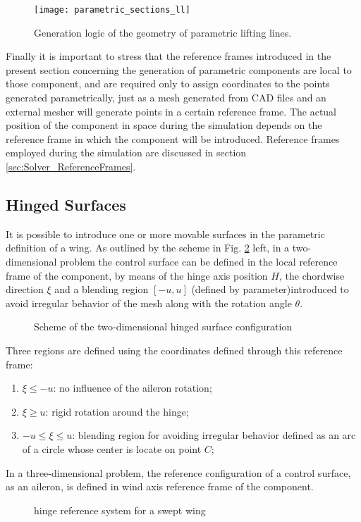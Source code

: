 \begin{figure}[h]
\centering
\texttt{[image: parametric\_sections\_ll]}
\caption{Generation logic of the geometry of parametric lifting lines.}
\label{fig:parametric_sections_ll}
\end{figure}

Finally it is important to stress that the reference frames introduced in the present section 
concerning the generation of parametric components are local to those component, and are required 
only to assign coordinates to the points generated parametrically, just as a mesh generated from 
CAD files and an external mesher will generate points in a certain reference frame. 
The actual position of the component in space during the simulation depends on the reference 
frame in which the component will be introduced. Reference frames employed during the simulation 
are discussed in section \ref{sec:Solver_ReferenceFrames}.

\subsection{Hinged Surfaces}
\label{sec:Hinge_surfaces}
It is possible to introduce one or more movable surfaces in the parametric definition of a wing.
As outlined by the scheme in Fig. \ref{fig:hinge} left, in a two-dimensional problem the control 
surface can be defined in the local reference frame of the component, by means of the hinge axis 
position $H$, the chordwise direction $\xi$ and a blending region $[-u, u]$ 
(defined by  parameter)introduced to avoid irregular behavior of the 
mesh along with the rotation angle $\theta$.
\begin{figure}[htbp]
\vspace{-3cm}
\centering
    \def\svgwidth{\columnwidth}
    
    \caption{Scheme of the two-dimensional hinged surface configuration}
    \label{fig:hinge}
\end{figure}
Three regions are defined using the coordinates defined through this reference frame:
\begin{enumerate}
  \item $\xi \leq -u$: no influence of the aileron rotation;
  \item $\xi \geq  u$: rigid rotation around the hinge;
  \item $-u \le \xi \le  u$: blending region for avoiding irregular behavior defined as an 
  arc of a circle whose center is locate on point $C$;
\end{enumerate}
In a three-dimensional problem, the reference configuration of a control surface, 
as an aileron, is defined in wind axis reference frame of the component.
\begin{figure}[htbp]
    \centering
    \def\svgwidth{\columnwidth}
    
    \caption{hinge reference system for a swept wing}
    \label{fig:hingeref}
\end{figure}

